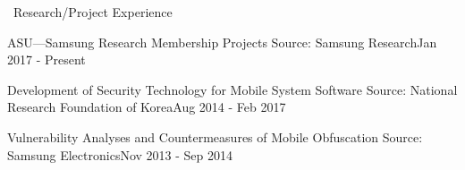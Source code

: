 \documentclass{resume} %
\begin{document}

\begin{rSection}{\faGenderless~Research/Project Experience}
	
	\begin{rSubsection3}
		{ASU---Samsung Research Membership Projects}
		{Source: Samsung Research}{Jan 2017 - Present}
	\end{rSubsection3}
	\vspace{-3mm}
	\begin{rSubsection3}
		{Development of Security Technology for Mobile System Software}
		{Source: National Research Foundation of Korea}{Aug 2014 - Feb 2017}
	\end{rSubsection3}
	\vspace{-3mm}
	\begin{rSubsection3}
		{Vulnerability Analyses and Countermeasures of Mobile Obfuscation}
		{Source: Samsung Electronics}{Nov 2013 - Sep 2014}
	\end{rSubsection3}
	\vspace{-3mm}

\end{rSection}
\end{document}
